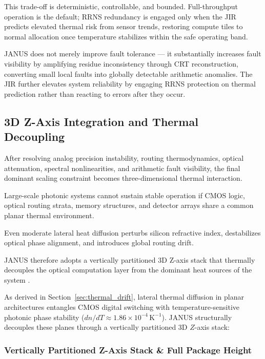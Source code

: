\documentclass[journal]{IEEEtran}
\begin{document}
This trade-off is deterministic, controllable, and bounded. Full-throughput operation is the default; RRNS redundancy is engaged only when the JIR predicts elevated thermal risk from sensor trends, restoring compute tiles to normal allocation once temperature stabilizes within the safe operating band.

JANUS does not merely improve fault tolerance --- it substantially increases fault visibility by amplifying residue inconsistency through CRT reconstruction, converting small local faults into globally detectable arithmetic anomalies. The JIR further elevates system reliability by engaging RRNS protection on thermal prediction rather than reacting to errors after they occur.

\subsection{\textbf{3D Z-Axis Integration and Thermal Decoupling}}
\label{sec:zaxis_thermal}

After resolving analog precision instability, routing thermodynamics, optical attenuation, spectral nonlinearities, and arithmetic fault visibility, the final dominant scaling constraint becomes three-dimensional thermal interaction.

Large-scale photonic systems cannot sustain stable operation if CMOS logic, optical routing strata, memory structures, and detector arrays share a common planar thermal environment.

Even moderate lateral heat diffusion perturbs silicon refractive index, destabilizes optical phase alignment, and introduces global routing drift.

JANUS therefore adopts a vertically partitioned 3D Z-axis stack that thermally decouples the optical computation layer from the dominant heat sources of the system \cite{Skacel2021,Chang2017}.

As derived in Section~\ref{sec:thermal_drift}, lateral thermal diffusion in planar architectures entangles CMOS digital switching with temperature-sensitive photonic phase stability ($dn/dT \approx 1.86 \times 10^{-4}\,\mathrm{K}^{-1}$). JANUS structurally decouples these planes through a vertically partitioned 3D $Z$-axis stack:

\subsubsection{\textbf{Vertically Partitioned Z-Axis Stack \& Full Package Height}}
\end{document}
